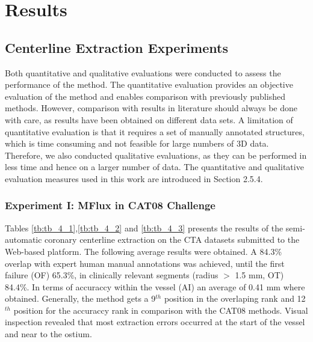 \chapter{Results}
%

\section{Centerline Extraction Experiments}

Both quantitative and qualitative evaluations were conducted to assess the performance of the method. The quantitative evaluation provides an objective evaluation of the method and enables comparison with previously published methods. However, comparison with results in literature should always be done with care, as results have been obtained on different data sets. A limitation of quantitative evaluation is that it requires a set of manually annotated structures, which is time consuming and not feasible for large numbers of 3D data. Therefore, we also conducted qualitative evaluations, as they can be performed in less time and hence on a larger number of data. The quantitative and qualitative evaluation measures used in this work are introduced in Section 2.5.4.


\subsection{Experiment I: MFlux in CAT08 Challenge}

Tables \ref{tb:tb_4_1},\ref{tb:tb_4_2} and \ref{tb:tb_4_3}  presents the results of the semi-automatic coronary centerline extraction on the CTA datasets submitted to the Web-based platform. The following average results were obtained. A 84.3\% overlap with expert human manual annotations was achieved, until the first failure (OF) 65.3\%, in clinically relevant segments (radius $>$ 1.5 mm, OT) 84.4\%. In terms of accuraccy within the vessel (AI) an average of 0.41 mm where obtained. Generally, the method gets a 9$^{th}$ position in the overlaping rank and 12$^{th}$ position for the accuraccy rank in comparison with the CAT08 methods. Visual inspection revealed that most extraction errors occurred at the start of the vessel and near to the ostium. 


